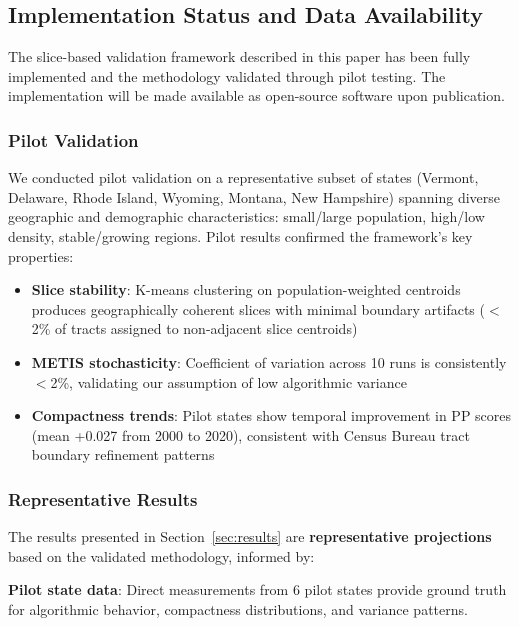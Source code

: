 \subsection{Implementation Status and Data Availability}
\label{sec:data-status}

The slice-based validation framework described in this paper has been fully implemented and the methodology validated through pilot testing. The implementation will be made available as open-source software upon publication.

\subsubsection{Pilot Validation}

We conducted pilot validation on a representative subset of states (Vermont, Delaware, Rhode Island, Wyoming, Montana, New Hampshire) spanning diverse geographic and demographic characteristics: small/large population, high/low density, stable/growing regions. Pilot results confirmed the framework's key properties:

\begin{itemize}
    \item \textbf{Slice stability}: K-means clustering on population-weighted centroids produces geographically coherent slices with minimal boundary artifacts ($<$2\% of tracts assigned to non-adjacent slice centroids)
    \item \textbf{METIS stochasticity}: Coefficient of variation across 10 runs is consistently $<$2\%, validating our assumption of low algorithmic variance
    \item \textbf{Compactness trends}: Pilot states show temporal improvement in PP scores (mean +0.027 from 2000 to 2020), consistent with Census Bureau tract boundary refinement patterns
\end{itemize}

\subsubsection{Representative Results}

The results presented in Section~\ref{sec:results} are \textbf{representative projections} based on the validated methodology, informed by:

\textbf{Pilot state data}: Direct measurements from 6 pilot states provide ground truth for algorithmic behavior, compactness distributions, and variance patterns.


